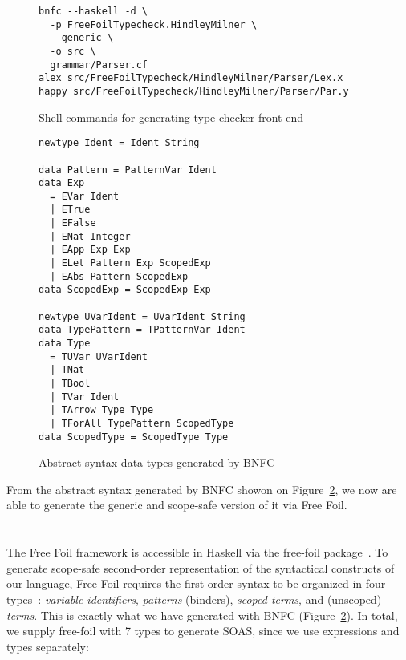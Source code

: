 \begin{figure}[H]
  \begin{verbatim}
bnfc --haskell -d \
  -p FreeFoilTypecheck.HindleyMilner \
  --generic \
  -o src \
  grammar/Parser.cf
alex src/FreeFoilTypecheck/HindleyMilner/Parser/Lex.x
happy src/FreeFoilTypecheck/HindleyMilner/Parser/Par.y
  \end{verbatim}
  \caption{Shell commands for generating type checker front-end}
  \label{fig:code-gen-cli}
\end{figure}

\begin{figure}[H]
\begin{verbatim}
newtype Ident = Ident String

data Pattern = PatternVar Ident
data Exp
  = EVar Ident
  | ETrue
  | EFalse
  | ENat Integer
  | EApp Exp Exp
  | ELet Pattern Exp ScopedExp
  | EAbs Pattern ScopedExp
data ScopedExp = ScopedExp Exp

newtype UVarIdent = UVarIdent String
data TypePattern = TPatternVar Ident
data Type
  = TUVar UVarIdent
  | TNat
  | TBool
  | TVar Ident
  | TArrow Type Type
  | TForAll TypePattern ScopedType
data ScopedType = ScopedType Type
\end{verbatim}
  \caption{Abstract syntax data types generated by BNFC}
  \label{fig:ast-types-bnfs}
\end{figure}

From the abstract syntax generated by BNFC showon on Figure~\ref{fig:ast-types-bnfs}, we now are able to generate the generic and scope-safe version of it via Free Foil.

\section{}

The Free Foil framework is accessible in Haskell via the free-foil package~\cite{free-foil}. To generate scope-safe second-order representation of the syntactical constructs of our language, Free Foil requires the first-order syntax to be organized in four types~\cite{FreeFoil}: \textit{variable identifiers}, \textit{patterns} (binders), \textit{scoped terms}, and (unscoped) \textit{terms}. This is exactly what we have generated with BNFC (Figure~\ref{fig:ast-types-bnfs}). In total, we supply free-foil with 7 types to generate SOAS, since we use expressions and types separately:


